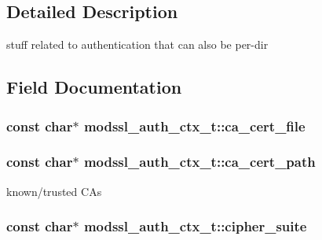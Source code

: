 \subsection{Detailed Description}
stuff related to authentication that can also be per-\/dir 

\subsection{Field Documentation}
\subsubsection[{\texorpdfstring{ca\+\_\+cert\+\_\+file}{ca_cert_file}}]{\setlength{\rightskip}{0pt plus 5cm}const char$\ast$ modssl\+\_\+auth\+\_\+ctx\+\_\+t\+::ca\+\_\+cert\+\_\+file}\hypertarget{structmodssl__auth__ctx__t_aa580f3c2ed5fc2c7d9cf48cf95ef836c}{}\label{structmodssl__auth__ctx__t_aa580f3c2ed5fc2c7d9cf48cf95ef836c}
\subsubsection[{\texorpdfstring{ca\+\_\+cert\+\_\+path}{ca_cert_path}}]{\setlength{\rightskip}{0pt plus 5cm}const char$\ast$ modssl\+\_\+auth\+\_\+ctx\+\_\+t\+::ca\+\_\+cert\+\_\+path}\hypertarget{structmodssl__auth__ctx__t_ab6907818bc85062a28c931d99f981ca7}{}\label{structmodssl__auth__ctx__t_ab6907818bc85062a28c931d99f981ca7}
known/trusted C\+As 
\subsubsection[{\texorpdfstring{cipher\+\_\+suite}{cipher_suite}}]{\setlength{\rightskip}{0pt plus 5cm}const char$\ast$ modssl\+\_\+auth\+\_\+ctx\+\_\+t\+::cipher\+\_\+suite}\hypertarget{structmodssl__auth__ctx__t_a9cabbc8c6b3b2b002f73b3add389ab96}{}\label{structmodssl__auth__ctx__t_a9cabbc8c6b3b2b002f73b3add389ab96}
